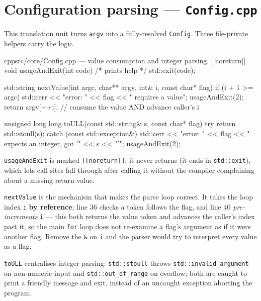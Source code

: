 \documentclass[
	english,
	letterpaper, oneside
]{article}
\begin{document}
\section{Configuration parsing --- \texttt{Config.cpp}}
\label{sec:configcpp}

This translation unit turns \texttt{argv} into a fully-resolved \texttt{Config}.
Three file-private helpers carry the logic.

\begin{sourcecode}{cpp}{src/core/Config.cpp --- value consumption and integer parsing.}
[[noreturn]] void usageAndExit(int code) { /* prints help */ std::exit(code); }

std::string nextValue(int argc, char** argv, int& i, const char* flag) {
  if (i + 1 >= argc) { std::cerr << "error: " << flag << " requires a value\n";
                       usageAndExit(2); }
  return argv[++i];                       // consume the value AND advance caller's i
}

unsigned long long toULL(const std::string& s, const char* flag) {
  try { return std::stoull(s); }
  catch (const std::exception&) {
    std::cerr << "error: " << flag << " expects an integer, got '" << s << "'\n";
    usageAndExit(2);
  }
}
\end{sourcecode}

\texttt{usageAndExit} is marked \texttt{[[noreturn]]}: it never returns (it ends
in \texttt{std::exit}), which lets call sites fall through after calling it
without the compiler complaining about a missing return value.

\texttt{nextValue} is the mechanism that makes the parse loop correct. It takes
the loop index \texttt{i} \textbf{by reference}; line 36 checks a token follows
the flag, and line 40 \emph{pre-increments} \texttt{i} --- this both returns the
value token and advances the caller's index past it, so the main \texttt{for}
loop does not re-examine a flag's argument as if it were another flag. Remove the
\texttt{\&} on \texttt{i} and the parser would try to interpret every value as a
flag.

\texttt{toULL} centralises integer parsing: \texttt{std::stoull} throws
\texttt{std::invalid\_argument} on non-numeric input and
\texttt{std::out\_of\_range} on overflow; both are caught to print a friendly
message and exit, instead of an uncaught exception aborting the program.
\end{document}
